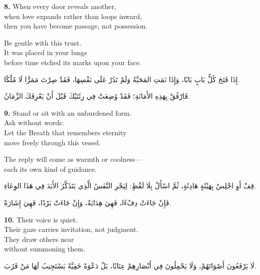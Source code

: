 \documentclass[11pt,a4paper,twoside]{book}
\begin{document}
\vspace{1em}
{\color{indigo}\bfseries 8.}\quad
When every door reveals another,\\
when love expands rather than loops inward,\\
then you have become passage, not possession.

Be gentle with this trust.\\
It was placed in your lungs\\
before time etched its marks upon your face.

\begin{flushright}
{\arabicfont
إِذَا فَتَحَ كُلُّ بَابٍ بَابًا،
وَإِذَا نَمَتِ المَحَبَّةُ وَلَمْ تَدُرْ عَلَى نَفْسِهَا،
فَقَدْ صِرْتَ مَمَرًّا لَا مُلْكًا.

فَارْفُقْ بِهَذِهِ الأَمَانَةِ؛
فَقَدْ وُضِعَتْ فِي رِئَتَيْكَ
قَبْلَ أَنْ يَعْرِفَكَ الزَّمَانُ.}
\end{flushright}

\vspace{1em}
{\color{indigo}\bfseries 9.}\quad
Stand or sit with an unburdened form.\\
Ask without words:\\
Let the Breath that remembers eternity\\
move freely through this vessel.

The reply will come as warmth or coolness—\\
each its own kind of guidance.

\begin{flushright}
{\arabicfont
قِفْ أَوِ اجْلِسْ بِهَيْئَةٍ هَادِئَةٍ،
ثُمَّ اسْأَلْ بِلَا لَفْظٍ:
لِيَجْرِ النَّفَسُ الَّذِي يَتَذَكَّرُ الأَبَدَ
فِي هَذَا الوِعَاءِ.

فَإِنْ جَاءَتْ دِفْءًا، فَهِيَ هِدَايَةٌ،
وَإِنْ جَاءَتْ بَرْدًا، فَهِيَ إِشَارَةٌ.}
\end{flushright}

\vspace{1em}
{\color{indigo}\bfseries 10.}\quad
Their voice is quiet.\\
Their gaze carries invitation, not judgment.\\
They draw others near\\
without summoning them.

\begin{flushright}
{\arabicfont
لَا يَرْفَعُونَ أَصْوَاتَهُمْ،
وَلَا يَحْمِلُونَ فِي أَبْصَارِهِمْ عِتَابًا،
بَلْ دَعْوَةً خَفِيَّةً
يَسْتَجِيبُ لَهَا مَنْ قَرُبَ.}
\end{flushright}
\end{document}

